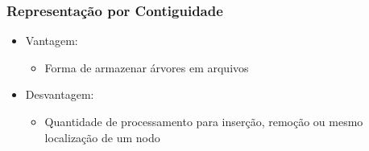\documentclass[aspectratio=169]{beamer}
\begin{document}
\begin{frame}[fragile]
\begin{itemize}
\begin{columns}[T]
\begin{column}{0.70\linewidth}
\begin{figure}[h]
\end{figure}
\end{column}
\end{columns}
\end{itemize}
\end{frame}

\begin{frame}\frametitle{Representação por Contiguidade}
\begin{itemize}
	\item Vantagem:
	\begin{itemize}
		\item Forma de armazenar árvores em arquivos
	\end{itemize}
	\item Desvantagem:
	\begin{itemize}
		\item Quantidade de processamento para inserção, remoção ou mesmo localização de um nodo
	\end{itemize}
\end{itemize}
\end{frame}
\end{document}
